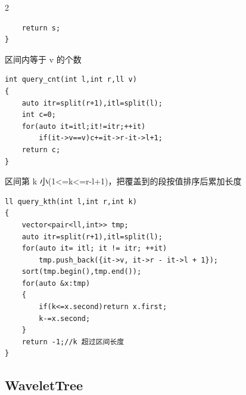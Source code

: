 \documentclass[UTF8,fontset=fandol,a4paper,twoside]{ctexart}
\newcommand{\note}[1]{{\fontsize{10}{12}\selectfont #1\par}}
\begin{document}
\begin{multicols}{2}
\begin{lstlisting}
    return s;
}
\end{lstlisting}
\note{区间内等于 v 的个数}
\begin{lstlisting}
int query_cnt(int l,int r,ll v)
{
    auto itr=split(r+1),itl=split(l);
    int c=0;
    for(auto it=itl;it!=itr;++it)
        if(it->v==v)c+=it->r-it->l+1;
    return c;
}
\end{lstlisting}
\note{区间第 k 小(\allowbreak{}1<\allowbreak{}=\allowbreak{}k<\allowbreak{}=\allowbreak{}r-\allowbreak{}l+\allowbreak{}1)\allowbreak{}，把覆盖到的段按值排序后累加长度}
\begin{lstlisting}
ll query_kth(int l,int r,int k)
{
    vector<pair<ll,int>> tmp;
    auto itr=split(r+1),itl=split(l);
    for(auto it= itl; it != itr; ++it)
        tmp.push_back({it->v, it->r - it->l + 1});
    sort(tmp.begin(),tmp.end());
    for(auto &x:tmp)
    {
        if(k<=x.second)return x.first;
        k-=x.second;
    }
    return -1;//k 超过区间长度
}
\end{lstlisting}
\subsection{WaveletTree}


\end{multicols}
\end{document}
